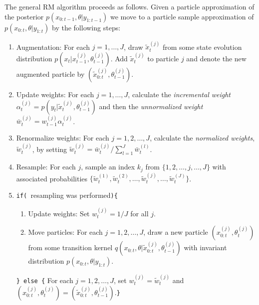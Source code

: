The general RM algorithm proceeds as follows. Given a particle approximation of the posterior $p(x_{0:t-1},\theta|y_{1:t-1})$ we move to a particle sample approximation of $p(x_{0:t},\theta|y_{1:t})$ by the following steps:
\begin{enumerate}
\item Augmentation: For each $j = 1,\ldots,J$, draw $\tilde{x}^{(j)}_t$ from some state evolution distribution $p\left(x_t|x^{(j)}_{t-1},\theta^{(j)}_{t-1}\right)$. Add $\tilde{x}^{(j)}_t$ to particle $j$ and denote the new augmented particle by $\left(\tilde{x}^{(j)}_{0:t},\theta^{(j)}_{t-1}\right)$.
\item Update weights: For each $j = 1,\ldots,J$, calculate the \emph{incremental weight} $\alpha^{(j)}_t = p\left(y_t|\tilde{x}^{(j)}_t,\theta^{(j)}_{t-1}\right)$ and then the \emph{unnormalized weight} $\bar{w}^{(j)}_t = w^{(j)}_{t-1}\alpha^{(j)}_t$.
\item Renormalize weights: For each $j = 1,2,\ldots,J$, calculate the \emph{normalized weights}, $\tilde{w}^{(j)}_t$, by setting $\tilde{w}^{(j)}_t = \bar{w}^{(j)}_t / \sum_{l=1}^J \bar{w}^{(l)}_t$.
\item Resample: For each $j$, sample an index $k_j$ from $\{1,2,\ldots,j,\ldots,J\}$ with associated probabilities $\{\tilde{w}^{(1)}_t,\tilde{w}^{(2)}_t,\ldots,\tilde{w}^{(j)}_t,\ldots,\tilde{w}^{(J)}_t\}$.
\item {\tt if( }resampling was performed{\tt )\{} \\
\begin{enumerate}[label=\alph*.]
\item Update weights: Set $w^{(j)}_t = 1 / J$ for all $j$.
\item \label{step:move} Move particles: For each $j = 1,2,\ldots,J$, draw a new particle $\left(x^{(j)}_{0:t},\theta^{(j)}_t\right)$ from some transition kernel $q\left(x_{0:t},\theta|\tilde{x}^{(j)}_{0:t},\theta^{(j)}_{t-1}\right)$ with invariant distribution $p(x_{0:t},\theta|y_{1:t})$.
\end{enumerate}
{\tt \} else \{} For each $j = 1,2,\ldots,J$, set $w^{(j)}_t = \tilde{w}^{(j)}_t$ and $\left(x^{(j)}_{0:t},\theta^{(j)}_t\right) = \left(\tilde{x}^{(j)}_{0:t},\theta^{(j)}_{t-1}\right)$.{\tt\}}
\end{enumerate}

